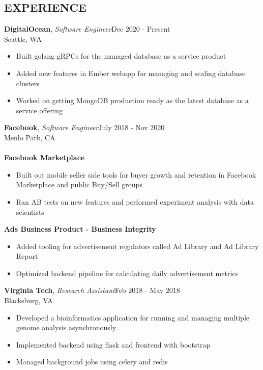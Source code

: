 \documentclass[line,margin]{res}
\begin{document}
\address{vinnyoodles@gmail.com | github.com/vinnyoodles}
\begin{resume}

	\section{EXPERIENCE}
		\textbf{DigitalOcean}, {\sl Software Engineer}\hfill Dec 2020 - Present\\Seattle, WA\\
		\begin{itemize} \itemsep 1pt
			\item Built golang gRPCs for the managed database as a service product
			\item Added new features in Ember webapp for managing and scaling database clusters
			\item Worked on getting MongoDB production ready as the latest database as a service offering
		\end{itemize}

		\textbf{Facebook}, {\sl Software Engineer}\hfill July 2018 - Nov 2020\\Menlo Park, CA\\
		\\ \textbf{Facebook Marketplace} 
		\begin{itemize} \itemsep 1pt 
			\item Built out mobile seller side tools for buyer growth and retention in Facebook Marketplace and public Buy/Sell groups
			\item Ran AB tests on new features and performed experiment analysis with data scientists
		\end{itemize}
		\textbf{Ads Business Product - Business Integrity} 
		\begin{itemize} \itemsep 1pt 
			\item Added tooling for advertisement regulators called Ad Library and Ad Library Report
			\item Optimized backend pipeline for calculating daily advertisement metrics 
		\end{itemize}
		\textbf{Virginia Tech}, {\sl Research Assistant}\hfill Feb 2018 - May 2018\\Blacksburg, VA\\
		\begin{itemize} \itemsep 1pt
			\item Developed a bioinformatics application for running and managing multiple genome analysis asynchronously
			\item Implemented backend using flask and frontend with bootstrap
			\item Managed background jobs using celery and redis
		\end{itemize}


\end{resume}
\end{document}
